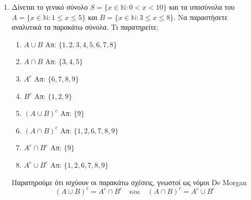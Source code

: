 \begin{enumerate}
  \item Δίνεται το γενικό σύνολο $S=\{x\in \mathbb{N} : 0<x<10\}$ και τα υποσύνολα 
    του $A=\{x\in \mathbb{N} : 1\leq x\leq 5\}$ και 
    $B=\{x\in \mathbb{N} : 3\leq x\leq 8\}$. 
    Να παραστήσετε αναλυτικά τα παρακάτω σύνολα.  Τι παρατηρείτε;
    \begin{enumerate}[(\roman*)]
      \item $A\cup B$ \hfill Απ: $ \{ 1,2,3,4,5,6,7,8 \} $ 
      \item $A\cap B$ \hfill Απ: $ \{ 3,4,5 \} $ 
      \item $A^c$ \hfill Απ: $ \{ 6,7,8,9 \} $ 
      \item $B^c$ \hfill Απ: $ \{ 1,2,9 \} $ 
      \item $(A\cup B)^c$ \hfill Απ: $ \{ 9 \} $ 
      \item $(A\cap B)^c$ \hfill Απ: $ \{ 1,2,6,7,8,9 \} $ 
      \item $A^c\cap B^c$ \hfill Απ: $ \{ 9 \} $  
      \item $A^c\cup B^c$ \hfill Απ: $ \{ 1,2,6,7,8,9 \} $ 
    \end{enumerate}
    \begin{rem*}
      Παρατηρούμε ότι ισχύουν οι παρακάτω σχέσεις, γνωστοί ως νόμοι De Morgan
      \[ (A \cup B)^{c} = A^{c} \cap B^{c} \quad \text{και} \quad 
      (A \cap B)^{c} = A^{c} \cup B^{c} \]
    \end{rem*}
\end{enumerate}





